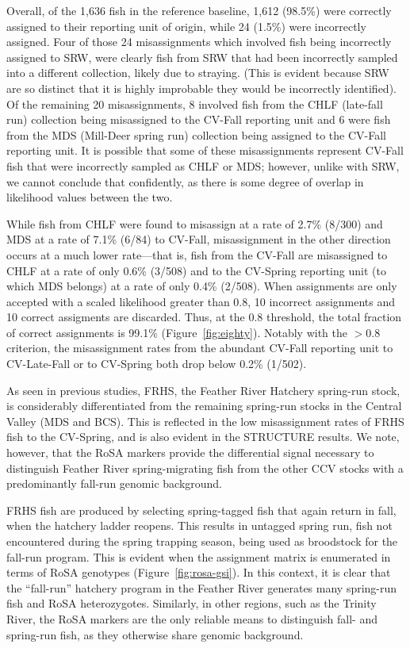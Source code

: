 Overall, of the 1,636 fish in the reference baseline, 1,612 (98.5\%) were correctly
assigned to their reporting unit of origin, while 24 (1.5\%) were incorrectly assigned.
Four of those 24 misassignments which involved fish being incorrectly assigned to
SRW, were clearly fish from SRW that had been incorrectly sampled into a different
collection, likely due to straying. (This is evident because SRW are so distinct that it is highly improbable they
would be incorrectly identified).  Of the remaining 20 misassignments,  8 involved fish from the
CHLF (late-fall run) collection being misassigned to the CV-Fall reporting unit and 6 were
fish from the MDS (Mill-Deer spring run) collection being assigned to the CV-Fall reporting unit.
It is possible that some of these misassignments represent CV-Fall fish that were incorrectly
sampled as CHLF or MDS; however, unlike with SRW,  we  cannot conclude that
confidently, as there is some degree of overlap in likelihood values between the two.

While fish from CHLF were found to misassign at a rate of 2.7\% (8/300) and MDS at a rate
of 7.1\% (6/84) to CV-Fall, misassignment in the other direction occurs at a much lower
rate---that is, fish from the CV-Fall are misassigned to CHLF at a rate
of only 0.6\% (3/508) and to the CV-Spring reporting unit (to which MDS belongs) at a rate
of only 0.4\% (2/508). When assignments are only accepted with a scaled likelihood greater than 0.8,
10 incorrect assignments and 10 correct assigments are discarded.  Thus,
at the 0.8 threshold, the total fraction of correct assignments is 99.1\% (Figure~\ref{fig:eighty}).
Notably with the $>$0.8 criterion, the misassignment rates from the abundant CV-Fall
reporting unit to CV-Late-Fall or to CV-Spring both drop below 0.2\% (1/502).  

As seen in previous studies, FRHS, the Feather River Hatchery
spring-run stock, is considerably differentiated from the remaining spring-run
stocks in the Central Valley (MDS and BCS). This is reflected in the low
misassignment rates of FRHS fish to the CV-Spring, and is also evident in the
STRUCTURE results.   We note, however, that the RoSA markers provide
the differential signal necessary to distinguish
Feather River spring-migrating fish from the other CCV stocks with a predominantly fall-run
genomic background. 

FRHS fish are produced by selecting spring-tagged fish that again return in fall, 
when the hatchery ladder reopens. This results in untagged spring run, fish not 
encountered during the spring trapping season, being used as broodstock for the fall-run program.
This is evident when the assignment matrix is enumerated in
terms of RoSA genotypes (Figure~\ref{fig:rosa-gsi}). In this context, it is clear that the ``fall-run'' hatchery
program in the Feather River generates many spring-run fish and RoSA heterozygotes.
Similarly, in other regions, such as the Trinity River, the RoSA markers are the only reliable means to distinguish fall-
and spring-run fish, as they otherwise share genomic background.

